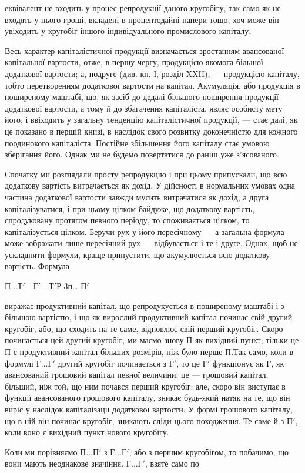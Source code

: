 \parcont{}  %
еквівалент не входить у процес репродукції даного кругобігу, так само
як не входять у нього гроші, вкладені в процентодайні папери тощо, хоч
може він увіходить у кругобіг іншого індивідуального промислового
капіталу.

Весь характер капіталістичної продукції визначається зростанням
авансованої капітальної вартости, отже, в першу чергу, продукцією якомога
більшої додаткової вартости; а, подруге (див. кн. І, розділ XXII),
— продукцією капіталу, тобто перетворенням додаткової вартости на
капітал. Акумуляція, або продукція в поширеному маштабі, що, як
засіб до дедалі більшого поширення продукції додаткової вартости, а тому
й до збагачення капіталіста, являє особисту мету його, і ввіходить у
загальну тенденцію капіталістичної продукції, — стає далі, як це
показано в першій книзі, в наслідок свого розвитку доконечністю
для кожного поодинокого капіталіста. Постійне збільшення його капіталу
стає умовою зберігання його. Однак ми не будемо повертатися до раніш
уже з’ясованого.

Спочатку ми розглядали просту репродукцію і при цьому припускали,
що всю додаткову вартість витрачається як дохід. У дійсності в нормальних
умовах одна частина додаткової вартости завжди мусить витрачатися як
дохід, а друга капіталізуватися, і при цьому цілком байдуже, що додаткову
вартість, спродуковану протягом певного періоду, то споживається
цілком, то капіталізується цілком. Беручи рух у його пересічному — а
загальна формула може зображати лише пересічний рух — відбувається
і те і друге. Однак, щоб не ускладняти формули, краще припустити,
що акумулюється всю додаткову вартість. Формула

$П\dots{} Т' — Г' — Т' Р$ 3п\dots{} $П'$

виражає продуктивний капітал, що репродукується в поширеному маштабі
і з більшою вартістю, і що як вирослий продуктивний капітал починає
свій другий кругобіг, або, що сходить на те саме, відновлює свій
перший кругобіг. Скоро починається цей другий кругобіг, ми маємо
знову П як вихідний пункт; тільки це П є продуктивний капітал
більших розмірів, ніж було перше $П. Т$ак само, коли в формулі $Г\dots{} Г'$
другий кругобіг починається з $Г'$, то це $Г'$ функціонує як Г, як авансований
грошовий капітал певної величини; це — грошовий капітал, більший,
ніж той, що ним почався перший кругобіг; але, скоро він виступає
в функції авансованого грошового капіталу, зникає будь-який натяк на
те, що він виріс у наслідок капіталізації додаткової вартости. У формі
грошового капіталу, що в ній він починає кругобіг, зникають сліди цього
походження. Те саме й з $П'$, коли воно є вихідний пункт нового
кругобігу.

Коли ми порівняємо $П\dots{} П'$ з $Г\dots{} Г'$, або з першим кругобігом, то
побачимо, що вони мають неоднакове значіння. $Г\dots{} Г'$, взяте само по
\parbreak{}  %
